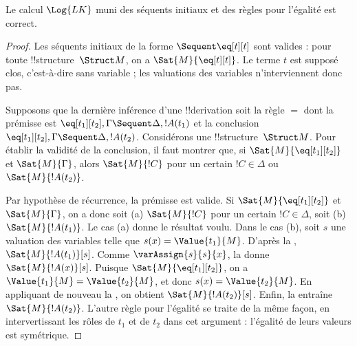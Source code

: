 \documentclass[../../../include/open-logic-section]{subfiles}
\begin{document}


\begin{prop}
Le calcul $\Log{LK}$ muni des séquents initiaux et des règles pour
l'égalité est correct.
\end{prop}

\begin{proof}
Les séquents initiaux de la forme ${} \Sequent \eq[t][t]$ sont
valides : pour toute !!{structure}~$\Struct M$, on a
$\Sat{M}{\eq[t][t]}$. Le terme $t$ est supposé clos, c'est-à-dire
sans variable ; les valuations des variables n'interviennent donc pas.

Supposons que la dernière inférence d'une !!{derivation} soit la
règle $=$ dont la prémisse est
$\eq[t_1][t_2], \Gamma \Sequent \Delta, !A(t_1)$ et la conclusion
$\eq[t_1][t_2], \Gamma \Sequent \Delta, !A(t_2)$.
Considérons une !!{structure}~$\Struct M$.
Pour établir la validité de la conclusion, il faut montrer que,
si $\Sat{M}{\eq[t_1][t_2]}$ et $\Sat{M}{\Gamma}$, alors
$\Sat{M}{!C}$ pour un certain $!C \in \Delta$ ou
$\Sat{M}{!A(t_2)}$.

Par hypothèse de récurrence, la prémisse est valide.
Si $\Sat{M}{\eq[t_1][t_2]}$ et $\Sat{M}{\Gamma}$, on a donc
soit (a) $\Sat{M}{!C}$ pour un certain $!C \in \Delta$,
soit (b) $\Sat{M}{!A(t_1)}$.
Le cas (a) donne le résultat voulu. Dans le cas (b), soit $s$
une valuation des variables telle que $s(x) = \Value{t_1}{M}$.
D'après la ,
$\Sat{M}{!A(t_1)}[s]$.
Comme $\varAssign{s}{s}{x}$, la
 donne $\Sat{M}{!A(x)}[s]$.
Puisque $\Sat{M}{\eq[t_1][t_2]}$, on a
$\Value{t_1}{M} = \Value{t_2}{M}$, et donc
$s(x) = \Value{t_2}{M}$.
En appliquant de nouveau la ,
on obtient $\Sat{M}{!A(t_2)}[s]$.
Enfin, la  entraîne
$\Sat{M}{!A(t_2)}$.
L'autre règle pour l'égalité se traite de la même façon, en
intervertissant les rôles de $t_1$ et de $t_2$ dans cet argument :
l'égalité de leurs valeurs est symétrique.
%
%
\end{proof}
\end{document}
